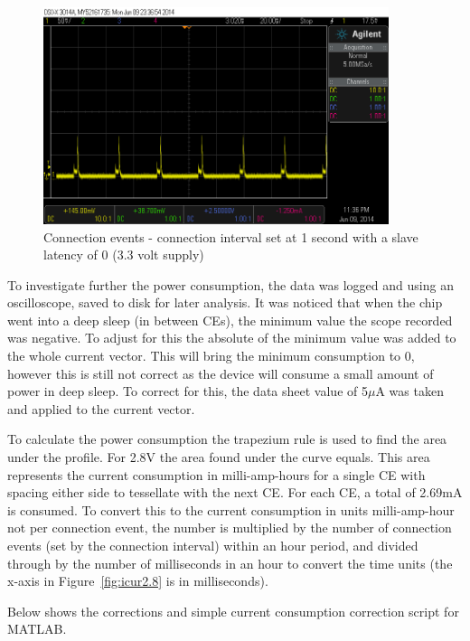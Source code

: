 \documentclass[]{article}
\begin{document}
\begin{figure}[H]
	\begin{center}
		\includegraphics[width = 0.9\textwidth]{ce}
	\end{center}
	\caption{Connection events - connection interval set at 1 second with a slave latency of 0 (3.3 volt supply)}
	\label{fig:ce}
\end{figure}

To investigate further the power consumption, the data was logged and using an oscilloscope, saved to disk for later analysis. It was noticed that when the chip went into a deep sleep (in between \ac{CE}s), the minimum value the scope recorded was negative. To adjust for this the absolute of the minimum value was added to the whole current vector. This will bring the minimum consumption to 0, however this is still not correct as the device will consume a small amount of power in deep sleep. To correct for this, the data sheet value of 5$\mu$A was taken and applied to the current vector. 

To calculate the power consumption the trapezium rule is used to find the area under the profile. For 2.8V the area found under the curve equals. This area represents the current consumption in milli-amp-hours for a single \ac{CE} with spacing either side to tessellate with the next \ac{CE}. For each \ac{CE}, a total of 2.69mA is consumed.  To convert this to the current consumption in units milli-amp-hour not per connection event, the number is multiplied by the number of connection events (set by the connection interval) within an hour period, and divided through by the number of milliseconds in an hour to convert the time units (the x-axis in Figure~\ref{fig:icur2.8} is in milliseconds). 

Below shows the corrections and simple current consumption correction script for MATLAB. 
\end{document}
